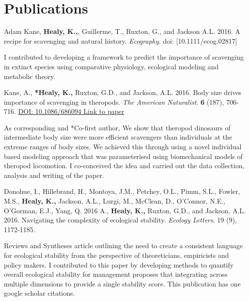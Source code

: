 \documentclass[10pt,a4paper]{article}
\begin{document}
\bigskip

\section{Publications}
\begin{flushleft}

\setlength{\parindent}{0mm} Adam Kane, \textbf{Healy, K.,}, Guillerme, T., Ruxton, G., and Jackson A.L. 2016. A recipe for scavenging and natural history. \textit{Ecography}. doi: [10.1111/ecog.02817]
\smallskip
\par{\fontsize{10.5}{10} I contributed to developing a framework to predict the importance of scavenging in extinct species using comparative physiology, ecological modeling and metabolic theory.}

\bigskip

\setlength{\parindent}{0mm}Kane, A., \textbf{*Healy, K.,} Ruxton, G.D., and Jackson, A.L. 2016. Body size drives importance of scavenging in theropods. \textit{The American Naturalist}. \textbf{6} (187), 706-716. \href{https://www.researchgate.net/profile/Kevin_Healy/publication/301279301_Body_Size_as_a_Driver_of_Scavenging_in_Theropod_Dinosaurs/links/570f8b2a08ae38897ba19c35.pdf.}{DOI: 10.1086/686094 Link to paper}
\smallskip
\par{\fontsize{10.5}{10} As corresponding and *Co-first author, We show that theropod dinosaurs of intermediate body size were more efficient scavengers than individuals at the extreme ranges of body sizes. We achieved this through using a novel individual based modeling approach that was parameterised using biomechanical models of theropod locomotion. I co-conceived the idea and carried out the data collection, analysis and writing of the paper.}

\bigskip

\setlength{\parindent}{0mm}Donohue, I., Hillebrand, H., Montoya, J.M., Petchey, O.L., Pimm, S.L., Fowler, M.S., \textbf{Healy, K.,} Jackson, A.L., Lurgi, M., McClean, D., O'Connor, N.E., O'Gorman, E.J., Yang, Q. 2016
 A., \textbf{Healy, K.,} Ruxton, G.D., and Jackson, A.L. 2016. Navigating the complexity of ecological stability. \textit{Ecology Letters}. 19 (9), 1172-1185.
\smallskip
\par{\fontsize{10.5}{10} Reviews and Syntheses article outlining the need to create a consistent language for ecological stability from the perspective of theoreticians, empiricists and policy makers. I contributed to this paper by developing methods to quantify overall ecological stability for management proposes that integrating across multiple dimensions to provide a single stability score. This publication has one google scholar citations.}


\end{flushleft}
\end{document}
